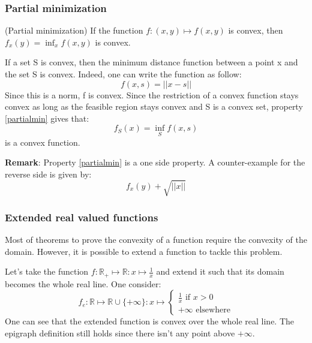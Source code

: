     \subsubsection{Partial minimization}
    
    \begin{property}\label{partialmin}(Partial minimization)
    If the function $f: (x,y) \mapsto f(x,y) $ is convex, then $f_x (y) = \inf_{x} f(x,y) $ is convex.
\end{property}

\begin{example}
\begin{leftbar}
If a set S is convex, then the minimum distance function between a point x and the set S is convex. Indeed, one can write the function as follow:
$$f(x,s) = ||x-s||$$
Since this is a norm, f is convex. Since the restriction of a convex function stays convex as long as the feasible region stays convex and S is a convex set, property \ref{partialmin} gives that:
$$ f_S(x) = \inf_{S} f(x,s)$$ 
is a convex function.
\end{leftbar}
\end{example}
    
\textbf{Remark}: Property \ref{partialmin} is a one side property. A counter-example for the reverse side is given by:
$$f_x(y) + \sqrt{||x||}$$

\subsubsection{Extended real valued functions}

Most of theorems to prove the convexity of a function require the convexity of the domain. However, it is possible to extend a function to tackle this problem. 

\begin{example}
\begin{leftbar}
Let's take the function $f: \mathbb{R}_+ \mapsto \mathbb{R}: x \mapsto \frac{1}{x}$ and extend it such that its domain becomes the whole real line. One consider: 
$$f_e: \mathbb{R} \mapsto \mathbb{R} \cup \{ + \infty \}: x \mapsto 
\begin{cases} \frac{1}{x} \text{ if } x > 0 \\
+ \infty \text{ elsewhere}
\end{cases}$$
One can see that the extended function is convex over the whole real line. The epigraph definition still holds since there isn't any point above $+\infty$.
\end{leftbar}
\end{example}

